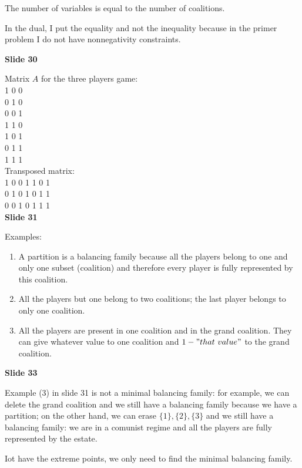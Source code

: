 \documentclass[pt11,a4paper,twoside,reqno,openright]{paper}
\begin{document}
\noindent The number of variables is equal to the number of coalitions.

\noindent In the dual, I put the equality and not the inequality because in the 
primer problem I do not have nonnegativity constraints.

\bigskip
\noindent \textbf{Slide 30}

\noindent Matrix $A$ for the three players game:\\
1	0	0\\
0	1	0\\
0	0	1\\
1	1	0\\
1	0	1\\
0	1	1\\
1	1	1\\

\noindent Transposed matrix:\\
1	0	0	1	1	0	1\\
0	1	0	1	0	1	1\\
0	0	1	0	1	1	1\\

\bigskip
\noindent \textbf{Slide 31}

\noindent Examples:
\begin{enumerate}
\item A partition is a balancing family because all the players belong to 
one and only one subset (coalition) and therefore every player is fully 
represented by this coalition.
\item All the players but one belong to two coalitions; the 
last player belongs to only one coalition.
\item All the players are present in one coalition and in the grand coalition. 
They can give whatever value to one coalition and $1-"that~value"$ to the 
grand coalition.
\end{enumerate}

\bigskip
\noindent \textbf{Slide 33}

\noindent Example (3) in slide 31 is not a minimal balancing family: for 
example, we can delete the grand coalition and we still have a balancing 
family because we have a partition; on the other hand, we can erase $\{1\}, 
\{2\},\{3\}$ and we still have a balancing family: we are in a comunist 
regime and all the players are fully represented by the estate.

\noindent Iot have the extreme points, we only need to find the minimal 
balancing family.
\end{document}
